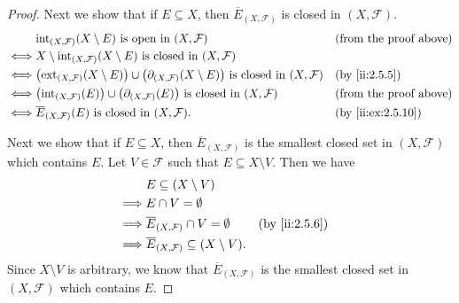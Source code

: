 \begin{proof}
  Next we show that if \(E \subseteq X\), then \(\overline{E}_{(X, \mathcal{F})}\) is closed in \((X, \mathcal{F})\).
  \begin{align*}
         & \text{int}_{(X, \mathcal{F})}(X \setminus E) \text{ is open in } (X, \mathcal{F})                                                                       &  & \text{(from the proof above)} \\
    \iff & X \setminus \text{int}_{(X, \mathcal{F})}(X \setminus E) \text{ is closed in } (X, \mathcal{F})                                                                                            \\
    \iff & \big(\text{ext}_{(X, \mathcal{F})}(X \setminus E)\big) \cup \big(\partial_{(X, \mathcal{F})}(X \setminus E)\big) \text{ is closed in } (X, \mathcal{F}) &  & \by{ii:2.5.5}                    \\
    \iff & \big(\text{int}_{(X, \mathcal{F})}(E)\big) \cup \big(\partial_{(X, \mathcal{F})}(E)\big) \text{ is closed in } (X, \mathcal{F})                         &  & \text{(from the proof above)} \\
    \iff & \overline{E}_{(X, \mathcal{F})}(E) \text{ is closed in } (X, \mathcal{F}).                                                                              &  & \by{ii:ex:2.5.10}
  \end{align*}

  Next we show that if \(E \subseteq X\), then \(\overline{E}_{(X, \mathcal{F})}\) is the smallest closed set in \((X, \mathcal{F})\) which contains \(E\).
  Let \(V \in \mathcal{F}\) such that \(E \subseteq X \setminus V\).
  Then we have
  \begin{align*}
             & E \subseteq (X \setminus V)                                                \\
    \implies & E \cap V = \emptyset                                                       \\
    \implies & \overline{E}_{(X, \mathcal{F})} \cap V = \emptyset         &  & \by{ii:2.5.6} \\
    \implies & \overline{E}_{(X, \mathcal{F})} \subseteq (X \setminus V).
  \end{align*}
  Since \(X \setminus V\) is arbitrary, we know that \(\overline{E}_{(X, \mathcal{F})}\) is the smallest closed set in \((X, \mathcal{F})\) which contains \(E\).


\end{proof}

